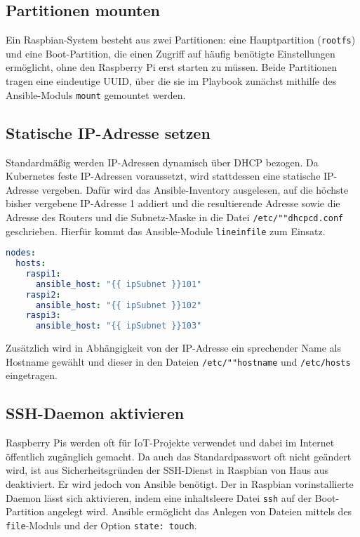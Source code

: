 \subsection{Partitionen mounten}\label{subsec:partitionen-mounten}

Ein Raspbian-System besteht aus zwei Partitionen: eine Hauptpartition (\texttt{rootfs}) und eine Boot-Partition, die einen Zugriff auf häufig benötigte Einstellungen ermöglicht, ohne den Raspberry Pi erst starten zu müssen.
Beide Partitionen tragen eine eindeutige UUID, über die sie im Playbook zunächst mithilfe des Ansible-Moduls \texttt{mount} gemountet werden.

\subsection{Statische IP-Adresse setzen}\label{subsec:statische-ip-adresse-setzen}

Standardmäßig werden IP-Adressen dynamisch über DHCP bezogen.
Da Kubernetes feste IP-Adressen voraussetzt, wird stattdessen eine statische IP-Adresse vergeben.
Dafür wird das Ansible-Inventory ausgelesen, auf die höchste bisher vergebene IP-Adresse 1 addiert und die resultierende Adresse sowie die Adresse des Routers und die Subnetz-Maske in die Datei \texttt{/etc/""dhcpcd.conf} geschrieben.
Hierfür kommt das Ansible-Module \texttt{lineinfile} zum Einsatz.

\begin{lstlisting}[language=yaml, caption=Ansible-Inventory mit drei Hosts]
nodes:
  hosts:
    raspi1:
      ansible_host: "{{ ipSubnet }}101"
    raspi2:
      ansible_host: "{{ ipSubnet }}102"
    raspi3:
      ansible_host: "{{ ipSubnet }}103"
\end{lstlisting}

Zusätzlich wird in Abhängigkeit von der IP-Adresse ein sprechender Name als Hostname gewählt und dieser in den Dateien \texttt{/etc/""hostname} und \texttt{/etc/hosts} eingetragen.

\subsection{SSH-Daemon aktivieren}\label{subsec:ssh-daemon-aktivieren}

Raspberry Pis werden oft für IoT-Projekte verwendet und dabei im Internet öffentlich zugänglich gemacht.
Da auch das Standardpasswort oft nicht geändert wird, ist aus Sicherheitsgründen der SSH-Dienst in Raspbian von Haus aus deaktiviert.
Er wird jedoch von Ansible benötigt.
Der in Raspbian vorinstallierte Daemon lässt sich aktivieren, indem eine inhaltsleere Datei \texttt{ssh} auf der Boot-Partition angelegt wird.
Ansible ermöglicht das Anlegen von Dateien mittels des \texttt{file}-Moduls und der Option \texttt{state: touch}.

